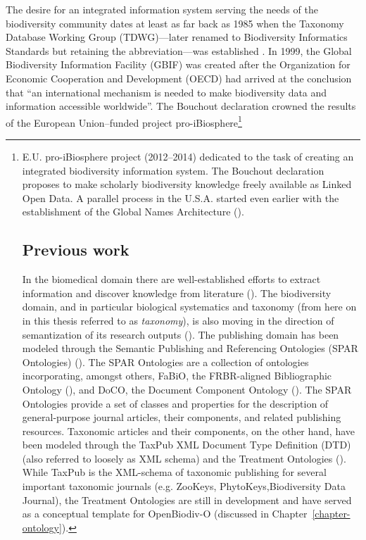 The desire for an integrated information system serving the needs of the biodiversity community dates at least as far back as 1985 when the Taxonomy Database Working Group (TDWG)---later renamed to Biodiversity Informatics Standards but retaining the abbreviation---was established \cite{noauthor_tdwg_nodate}.  In 1999, the Global Biodiversity Information Facility (GBIF) was created \cite{noauthor_what_nodate} after the Organization for Economic Cooperation and Development (OECD) had arrived at the conclusion that ``an international mechanism is needed to make biodiversity data and information accessible worldwide''.  The Bouchout declaration \cite{noauthor_bouchout_nodate} crowned the results of the European Union--funded project pro-iBiosphere\footnote{E.U. pro-iBiosphere project \cite{noauthor_pro-ibiosphere_nodate} (2012--2014) dedicated to the task of creating an integrated biodiversity information system.  The Bouchout declaration proposes to make scholarly biodiversity knowledge freely available as Linked Open Data.  A parallel process in the U.S.A. started even earlier with the establishment of the Global Names Architecture (\cite{patterson_names_2010,pyle_towards_2016}).

\section{Previous work}

In the biomedical domain there are well-established efforts to extract information and discover knowledge from literature (\cite{momtchev_expanding_2009, williams_open_2012, rebholz-schuhmann_facts_2005}).  The biodiversity domain, and in particular biological systematics and taxonomy (from here on in this thesis referred to as \emph{taxonomy}), is also moving in the direction of semantization of its research outputs (\cite{kennedy_scientific_2005,penev_fast_2010, tzitzikas_integrating_2013}).  The publishing domain has been modeled through the Semantic Publishing and Referencing Ontologies (SPAR Ontologies) (\cite{peroni_semantic_2014}).   The SPAR Ontologies are a collection of ontologies incorporating, amongst others, FaBiO, the FRBR-aligned Bibliographic Ontology (\cite{peroni_fabio_2012}), and DoCO, the Document Component Ontology (\cite{constantin_document_2016}).   The SPAR Ontologies provide a set of classes and properties for the description of general-purpose journal articles, their components, and related publishing resources.  Taxonomic articles and their components, on the other hand, have been modeled through the TaxPub XML Document Type Definition (DTD) (also referred to loosely as XML schema) and the Treatment Ontologies (\cite{catapano_taxpub:_2010}).  While TaxPub is the XML-schema of taxonomic publishing for several important taxonomic journals (e.g. ZooKeys, PhytoKeys,Biodiversity Data Journal), the Treatment Ontologies are still in development and have served as a conceptual template for OpenBiodiv-O (discussed in Chapter~\ref{chapter-ontology}). 

}
